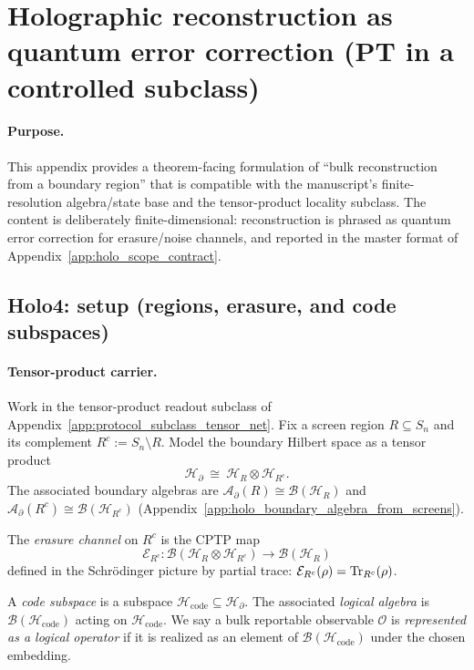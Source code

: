 \section{Holographic reconstruction as quantum error correction (PT in a controlled subclass)}
\label{app:holo_reconstruction_surrogate}

\paragraph{Purpose.}
\AuditTag This appendix provides a theorem-facing formulation of ``bulk reconstruction from a boundary region'' that is compatible
with the manuscript's finite-resolution algebra/state base and the tensor-product locality subclass.
The content is deliberately finite-dimensional: reconstruction is phrased as quantum error correction for erasure/noise channels,
and reported in the master format of Appendix~\ref{app:holo_scope_contract}.

\subsection{Holo4: setup (regions, erasure, and code subspaces)}
\label{subsec:holo4_setup}

\paragraph{Tensor-product carrier.}
\MathTag Work in the tensor-product readout subclass of Appendix~\ref{app:protocol_subclass_tensor_net}.
Fix a screen region $R\subseteq S_n$ and its complement $R^c:=S_n\setminus R$.
Model the boundary Hilbert space as a tensor product
\[
\mathcal{H}_{\partial}\ \cong\ \mathcal{H}_{R}\otimes \mathcal{H}_{R^c}.
\]
The associated boundary algebras are $\mathcal{A}_{\partial}(R)\cong\mathcal{B}(\mathcal{H}_R)$ and
$\mathcal{A}_{\partial}(R^c)\cong\mathcal{B}(\mathcal{H}_{R^c})$ (Appendix~\ref{app:holo_boundary_algebra_from_screens}).

\begin{definition}
\label{def:holo_erasure_channel}
\MathTag The \emph{erasure channel} on $R^c$ is the CPTP map
\[
\mathcal{E}_{R^c}:\mathcal{B}(\mathcal{H}_{R}\otimes\mathcal{H}_{R^c})\to \mathcal{B}(\mathcal{H}_{R})
\]
defined in the Schr\"odinger picture by partial trace:
$\mathcal{E}_{R^c}(\rho)=\mathrm{Tr}_{R^c}(\rho)$.
\end{definition}

\begin{definition}
\label{def:holo_code_and_logical_algebra}
\MathTag A \emph{code subspace} is a subspace $\mathcal{H}_{\mathrm{code}}\subseteq \mathcal{H}_{\partial}$.
The associated \emph{logical algebra} is $\mathcal{B}(\mathcal{H}_{\mathrm{code}})$ acting on $\mathcal{H}_{\mathrm{code}}$.
We say a bulk reportable observable $\mathcal{O}$ is \emph{represented as a logical operator} if it is realized as an element of
$\mathcal{B}(\mathcal{H}_{\mathrm{code}})$ under the chosen embedding.
\end{definition}

